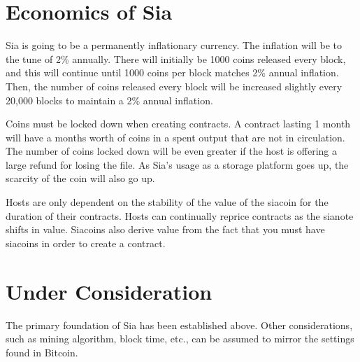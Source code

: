 \documentclass[twocolumn]{article}
\begin{document}
\section{Economics of Sia}
Sia is going to be a permanently inflationary currency.
The inflation will be to the tune of 2\% annually.
There will initially be 1000 coins released every block, and this will continue until 1000 coins per block matches 2\% annual inflation.
Then, the number of coins released every block will be increased slightly every 20,000 blocks to maintain a 2\% annual inflation.

Coins must be locked down when creating contracts.
A contract lasting 1 month will have a months worth of coins in a spent output that are not in circulation.
The number of coins locked down will be even greater if the host is offering a large refund for losing the file.
As Sia's usage as a storage platform goes up, the scarcity of the coin will also go up.

Hosts are only dependent on the stability of the value of the siacoin for the duration of their contracts.
Hosts can continually reprice contracts as the sianote shifts in value.
Siacoins also derive value from the fact that you must have siacoins in order to create a contract.



\section{Under Consideration}
The primary foundation of Sia has been established above.
Other considerations, such as mining algorithm, block time, etc., can be assumed to mirror the settings found in Bitcoin.
\end{document}
